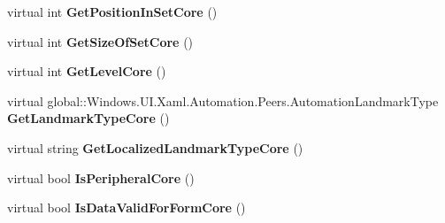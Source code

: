 \begin{DoxyCompactItemize}
\mbox{\label{class_windows_1_1_u_i_1_1_xaml_1_1_automation_1_1_peers_1_1_automation_peer_a1bcb3ef7e7391852a768d6874d898f73}} 
virtual int {\bfseries Get\+Position\+In\+Set\+Core} ()
\item 
\mbox{\label{class_windows_1_1_u_i_1_1_xaml_1_1_automation_1_1_peers_1_1_automation_peer_a4f2274f1bbafc48d35ae4a1baaf68144}} 
virtual int {\bfseries Get\+Size\+Of\+Set\+Core} ()
\item 
\mbox{\label{class_windows_1_1_u_i_1_1_xaml_1_1_automation_1_1_peers_1_1_automation_peer_aa68b2502b978bd14d3692f0943c7ebe2}} 
virtual int {\bfseries Get\+Level\+Core} ()
\item 
\mbox{\label{class_windows_1_1_u_i_1_1_xaml_1_1_automation_1_1_peers_1_1_automation_peer_a16b5c59f62d9cfb375b06085b3ebface}} 
virtual global\+::\+Windows.\+U\+I.\+Xaml.\+Automation.\+Peers.\+Automation\+Landmark\+Type {\bfseries Get\+Landmark\+Type\+Core} ()
\item 
\mbox{\label{class_windows_1_1_u_i_1_1_xaml_1_1_automation_1_1_peers_1_1_automation_peer_a81ded2ee8cb403207b5438e524931e09}} 
virtual string {\bfseries Get\+Localized\+Landmark\+Type\+Core} ()
\item 
\mbox{\label{class_windows_1_1_u_i_1_1_xaml_1_1_automation_1_1_peers_1_1_automation_peer_a5868d299d4d9698f50f5f3af851f85d2}} 
virtual bool {\bfseries Is\+Peripheral\+Core} ()
\item 
\mbox{\label{class_windows_1_1_u_i_1_1_xaml_1_1_automation_1_1_peers_1_1_automation_peer_a375e173803947dba5bb2ee40016d54e9}} 
virtual bool {\bfseries Is\+Data\+Valid\+For\+Form\+Core} ()
\item 
\mbox{\label{class_windows_1_1_u_i_1_1_xaml_1_1_automation_1_1_peers_1_1_automation_peer_a03e2b030728b5480baca09928e51811f}} 

\end{DoxyCompactItemize}
